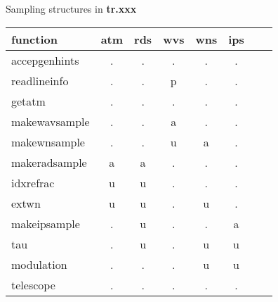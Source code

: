 \documentclass{article}
\begin{document}
\vfill

\begin{center}
{\large Sampling structures in {\bf tr.xxx}}\\[.5cm]
\begin{tabular}{l|ccccccc}
function
   & atm & rds & wvs & wns & ips \\
\hline
accepgenhints
   & .   & .   & .   & .   & .   \\
readlineinfo
   & .   & .   & p   & .   & .   \\
getatm
   & .   & .   & .   & .   & .   \\
makewavsample
   & .   & .   & a   & .   & .   \\
makewnsample
   & .   & .   & u   & a   & .   \\
makeradsample
   & a   & a   & .   & .   & .   \\
idxrefrac
   & u   & u   & .   & .   & .   \\
extwn
   & u   & u   & .   & u   & .   \\
makeipsample
   & .   & u   & .   & .   & a   \\
tau
   & .   & u   & .   & u   & u   \\
modulation
   & .   & .   & .   & u   & u   \\
telescope
   & .   & .   & .   & .   & .   \\
\hline
\end{tabular}
\end{center}
\end{document}
